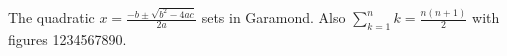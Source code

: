 \documentclass{article}
\begin{document}
The quadratic $x=\frac{-b\pm\sqrt{b^2-4ac}}{2a}$ sets in Garamond.
Also $\sum_{k=1}^{n}k=\frac{n(n+1)}{2}$ with figures 1234567890.
\end{document}
